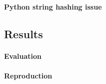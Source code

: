 \documentclass[10pt]{article}
\begin{document}
\paragraph{Python string hashing issue}

\subsection{Results}

\paragraph{Evaluation}


\paragraph{Reproduction}



\newpage
 
\end{document}

